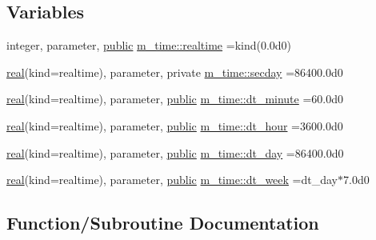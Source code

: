 \subsection*{Variables}
\begin{DoxyCompactItemize}
\item 
integer, parameter, \hyperlink{M__stopwatch_83_8txt_a2f74811300c361e53b430611a7d1769f}{public} \hyperlink{namespacem__time_ac10ea9e8d59ec74eaa7d89f2517d7422}{m\+\_\+time\+::realtime} =kind(0.\+0d0)
\item 
\hyperlink{read__watch_83_8txt_abdb62bde002f38ef75f810d3a905a823}{real}(kind=realtime), parameter, private \hyperlink{namespacem__time_a48130b5a95a3f2e776269dcee1426797}{m\+\_\+time\+::secday} =86400.\+0d0
\item 
\hyperlink{read__watch_83_8txt_abdb62bde002f38ef75f810d3a905a823}{real}(kind=realtime), parameter, \hyperlink{M__stopwatch_83_8txt_a2f74811300c361e53b430611a7d1769f}{public} \hyperlink{namespacem__time_a9fe6fbb44e2779a2fcf96fba36c08918}{m\+\_\+time\+::dt\+\_\+minute} =60.\+0d0
\item 
\hyperlink{read__watch_83_8txt_abdb62bde002f38ef75f810d3a905a823}{real}(kind=realtime), parameter, \hyperlink{M__stopwatch_83_8txt_a2f74811300c361e53b430611a7d1769f}{public} \hyperlink{namespacem__time_aa0ca2172092f5e7dcc9b8524e6516fd8}{m\+\_\+time\+::dt\+\_\+hour} =3600.\+0d0
\item 
\hyperlink{read__watch_83_8txt_abdb62bde002f38ef75f810d3a905a823}{real}(kind=realtime), parameter, \hyperlink{M__stopwatch_83_8txt_a2f74811300c361e53b430611a7d1769f}{public} \hyperlink{namespacem__time_a97725f8d657c24badff19a794f323a6b}{m\+\_\+time\+::dt\+\_\+day} =86400.\+0d0
\item 
\hyperlink{read__watch_83_8txt_abdb62bde002f38ef75f810d3a905a823}{real}(kind=realtime), parameter, \hyperlink{M__stopwatch_83_8txt_a2f74811300c361e53b430611a7d1769f}{public} \hyperlink{namespacem__time_a3d53519e90264faccdae67e389ffc003}{m\+\_\+time\+::dt\+\_\+week} =dt\+\_\+day$\ast$7.\+0d0
\end{DoxyCompactItemize}


\subsection{Function/\+Subroutine Documentation}
\mbox{\label{M__time_8f90_a09223e2da0c23850fad035407582fd68}} 
